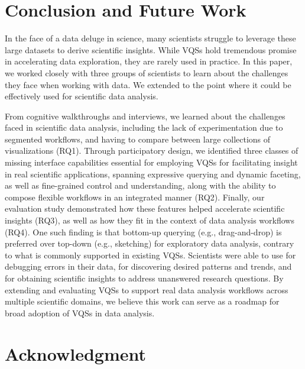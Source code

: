 \section{Conclusion and Future Work} \label{conclusion}
\par In the face of a data deluge in science, many scientists struggle to leverage these large datasets to derive scientific insights. While VQSs hold tremendous promise in accelerating data exploration, they are rarely used in practice. In this paper, we worked closely with three groups of scientists to learn about the challenges they face when working with data. We extended  to the point where it could be effectively used for scientific data analysis. 
\par From cognitive walkthroughs and interviews, we learned about the challenges faced in scientific data analysis, including the lack of experimentation due to segmented workflows, and having to compare between large collections of visualizations (RQ1). Through participatory design, we identified three classes of missing interface capabilities  essential for employing VQSs for facilitating insight in real scientific applications, spanning expressive querying and dynamic faceting, as well as fine-grained control and understanding, along with the ability to compose flexible workflows in an integrated manner (RQ2). Finally, our evaluation study demonstrated how these features helped accelerate scientific insights (RQ3), as well as how they fit in the context of data analysis workflows (RQ4). One such finding is that bottom-up querying (e.g., drag-and-drop) is preferred over top-down (e.g., sketching) for exploratory data analysis, contrary to what is commonly supported in existing VQSs. Scientists were able to use \zv for debugging errors in their data, for discovering desired patterns and trends, and for obtaining scientific insights to address unanswered research questions. By extending and evaluating VQSs to support real data analysis workflows across multiple scientific domains, we believe this work can serve as a roadmap for broad adoption of VQSs in data analysis.
\section{Acknowledgment}
\par {}